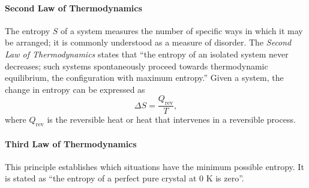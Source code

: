 \documentclass[a4paper,10pt]{article}
\theoremstyle{plain}
\theoremstyle{definition}
\theoremstyle{remark}
\newcommand{\quotes}[1]{``#1''}
\begin{document}
\paragraph{Second Law of Thermodynamics}The entropy $S$ of a system measures the number of specific ways in which it may be arranged; it is commonly understood as a measure of disorder. The \textit{Second Law of Thermodynamics} states that \quotes{the entropy of an isolated system never decreases; such systems spontaneously proceed towards thermodynamic equilibrium, the configuration with maximum entropy.} Given a system, the change in entropy can be expressed as
\begin{equation}
\Delta S = \frac{Q_{\text{rev}}}{T},
\end{equation}
where $Q_{\text{rev}}$ is the reversible heat or heat that intervenes in a reversible process.
\paragraph{Third Law of Thermodynamics}This principle establishes which situations have the minimum possible entropy. It is stated as \quotes{the entropy of a perfect pure crystal at 0 K is zero}.
\end{document}
